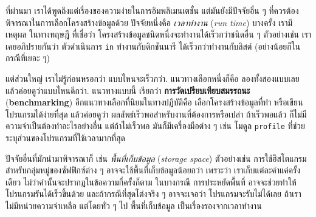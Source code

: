 ที่ผ่านมา เราได้พูดถึงแต่เรื่องของความง่ายในการอิมพลิเมนเตชั่น
แต่มันยังมีปัจจัยอื่น ๆ ที่ควรต้องพิจารณาในการเลือกโครงสร้างข้อมูลด้วย
ปัจจัยหนึ่งคือ \textit{เวลาทำงาน} (\textit{run time})
บางครั้ง เรามีเหตุผล ในทางทฤษฎี ที่เชื่อว่า โครงสร้างข้อมูลชนิดหนึ่งจะทำงานได้เร็วกว่าชนิดอื่น ๆ
ตัวอย่างเช่น เราเคยอภิปรายกันว่า ตัวดำเนินการ \texttt{in} ทำงานกับดิกชันนารี ได้เร็วกว่าทำงานกับลิสต์
(อย่างน้อยก็ในกรณีที่เยอะ ๆ)


แต่ส่วนใหญ่ เราไม่รู้ก่อนหรอกว่า แบบไหนจะเร็วกว่า.
แนวทางเลือกหนึ่งก็คือ ลองทั้งสองแบบเลย แล้วค่อยดูว่าแบบไหนดีกว่า.
แนวทางแบบนี้ เรียกว่า \textbf{การวัดเปรียบเทียบสมรรถนะ} (\textbf{benchmarking})
อีกแนวทางเลือกที่นิยมในทางปฏิบัติคือ เลือกโครงสร้างข้อมูลที่ทำ หรือเขียนโปรแกรมได้ง่ายที่สุด 
แล้วค่อยดูว่า ผลลัพธ์เร็วพอสำหรับงานที่ต้องการหรือเปล่า
ถ้าเร็วพอแล้ว ก็ไม่มีความจำเป็นต้องทำอะไรอย่างอื่น
แต่ถ้าไม่เร็วพอ มันก็มีเครื่องมือต่าง ๆ เช่น โมดูล \texttt{profile} ที่ช่วยระบุส่วนของโปรแกรมที่ใช้เวลามากที่สุด


ปัจจัยอื่นที่มักนำมาพิจารณาก็ เช่น \textit{พื้นที่เก็บข้อมูล} (\textit{storage space})
ตัวอย่างเช่น การใช้ฮิสโตแกรม สำหรับกลุ่มหมู่ของซัฟฟิกซ์ต่าง ๆ อาจจะใช้พื้นที่เก็บข้อมูลน้อยกว่า
เพราะว่า เราเก็บแต่ละคำแค่ครั้งเดียว ไม่ว่าคำนั้นจะปรากฎในข้อความกี่ครั้งก็ตาม
ในบางกรณี การประหยัดพื้นที่ อาจจะช่วยทำให้โปรแกรมรันได้เร็วขึ้นด้วย
และถ้ากรณีที่สุดโต่งจริง ๆ อาจจะเจอว่า โปรแกรมจะรับไม่ได้เลย ถ้าเราไม่มีหน่วยความจำเหลือ
แต่โดยทั่ว ๆ ไป พื้นที่เก็บข้อมูล เป็นเรื่องรองจากเวลาทำงาน


